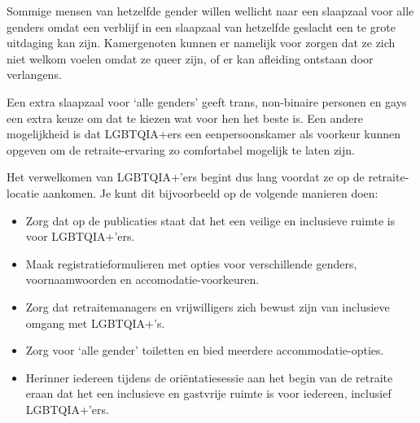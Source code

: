 \documentclass[12pt,openany]{book}
\begin{document}
Sommige mensen van hetzelfde gender willen wellicht naar een slaapzaal voor alle genders omdat een verblijf in een slaapzaal van hetzelfde geslacht een te grote uitdaging kan zijn. Kamergenoten kunnen er namelijk voor zorgen dat ze zich niet welkom voelen omdat ze queer zijn, of er kan afleiding ontstaan door verlangens.

Een extra slaapzaal voor ‘alle genders’ geeft trans, non-binaire personen en gays een extra keuze om dat te kiezen wat voor hen het beste is. Een andere mogelijkheid is dat LGBTQIA+ers een eenpersoonskamer als voorkeur kunnen opgeven om de retraite-ervaring zo comfortabel mogelijk te laten zijn. 

Het verwelkomen van LGBTQIA+’ers begint dus lang voordat ze op de retraite-locatie aankomen. Je kunt dit bijvoorbeeld op de volgende manieren doen:

\begin{itemize}
  \setlength\itemsep{-0.3em}
  \item Zorg dat op de publicaties staat dat het een veilige en inclusieve ruimte is voor LGBTQIA+’ers.
  \item Maak registratieformulieren met opties voor verschillende genders, voornaamwoorden en accomodatie-voorkeuren.
  \item Zorg dat retraitemanagers en vrijwilligers zich bewust zijn van inclusieve omgang met LGBTQIA+’s.
  \item Zorg voor ‘alle gender’ toiletten en bied meerdere accommodatie-opties.
  \item Herinner iedereen tijdens de oriëntatiesessie aan het begin van de retraite eraan dat het een inclusieve en gastvrije ruimte is voor iedereen, inclusief LGBTQIA+’ers.
\end{itemize}

\begin{figure}[h]
    \centering
\end{figure}
\end{document}
